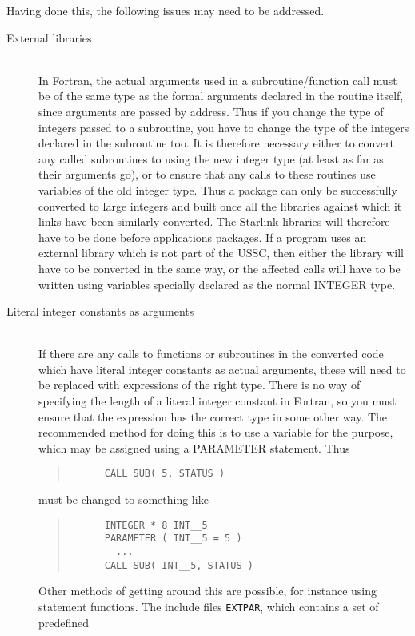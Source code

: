 \documentclass[twoside,11pt]{article}
\newcommand{\html}[1]{}
\renewcommand{\_}{\texttt{\symbol{95}}}
\newcommand{\file}[1]{{\tt #1}}
\newcommand{\ditem}[1]{\item[#1]\mbox{}\\}
\newenvironment{squote}{\begin{quote}\begin{small}}{\end{small}\end{quote}}
\begin{document}
Having done this, the following issues may need to be addressed.
\begin{description}
%
\ditem{External libraries}
In Fortran, the actual arguments used in a subroutine/function
call must be of the same type as the formal arguments declared
in the routine itself, since arguments are passed by address.
Thus if you change the type of integers passed to a subroutine,
you have to change the type of the integers declared in the subroutine too.
It is therefore necessary either to convert any called subroutines
to using the new integer type (at least as far as their arguments go), 
or to ensure that any calls to these routines use variables of 
the old integer type.
Thus a package can only be successfully converted to large integers
and built once all the libraries against which it links have been 
similarly converted.  The Starlink libraries will therefore have to
be done before applications packages.
If a program uses an external library which is not part of the USSC,
then either the library will have to be converted in the same way,
or the affected calls will have to be written using 
variables specially declared as the normal INTEGER type.
\html{\begin{squote}\end{squote}}
%
\ditem{Literal integer constants as arguments}
If there are any calls to functions or subroutines in the converted 
code which have literal integer constants as actual arguments,
these will need to be replaced with expressions of the right type.
There is no way of specifying the length of a literal integer constant
in Fortran, so you must ensure that the expression has the correct type
in some other way.
The recommended method for doing this is to use a variable for the
purpose, which may be assigned using a PARAMETER statement.
Thus
\begin{squote}
\begin{verbatim}
      CALL SUB( 5, STATUS )
\end{verbatim}
\end{squote}
must be changed to something like
\begin{squote}
\begin{verbatim}
      INTEGER * 8 INT__5
      PARAMETER ( INT__5 = 5 )
        ...
      CALL SUB( INT__5, STATUS )
\end{verbatim}
\end{squote}
Other methods of getting around this are possible,
for instance using statement functions.
The include files \file{EXT\_PAR}, which contains a set of predefined

\end{description}
\end{document}
